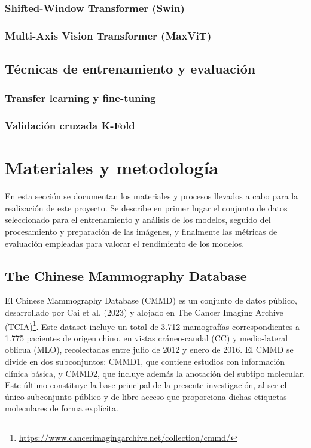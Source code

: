 \documentclass[a4paper,10pt]{book}
\begin{document}
\subsection{Shifted-Window Transformer (Swin)}
\subsection{Multi-Axis Vision Transformer (MaxViT)}
\section{Técnicas de entrenamiento y evaluación}
\subsection{Transfer learning y fine-tuning}
\subsection{Validación cruzada K-Fold}



\chapter{Materiales y metodología}

En esta sección se documentan los materiales y procesos llevados a cabo para la realización de este proyecto. Se describe en primer lugar el conjunto de datos seleccionado para el entrenamiento y análisis de los modelos, seguido del procesamiento y preparación de las imágenes, y finalmente las métricas de evaluación empleadas para valorar el rendimiento de los modelos.

\section{The Chinese Mammography Database}

El Chinese Mammography Database (CMMD) es un conjunto de datos público, desarrollado por Cai et al. (2023) \cite{cai_online_2023} y alojado en The Cancer Imaging Archive (TCIA)\footnote{\url{https://www.cancerimagingarchive.net/collection/cmmd/}}. Este dataset incluye un total de 3.712 mamografías correspondientes a 1.775 pacientes de origen chino, en vistas cráneo-caudal (CC) y medio-lateral oblicua (MLO), recolectadas entre julio de 2012 y enero de 2016. El CMMD se divide en dos subconjuntos: CMMD1, que contiene estudios con información clínica básica, y CMMD2, que incluye además la anotación del subtipo molecular. Este último constituye la base principal de la presente investigación, al ser el único subconjunto público y de libre acceso que proporciona dichas etiquetas moleculares de forma explícita.
\end{document}
